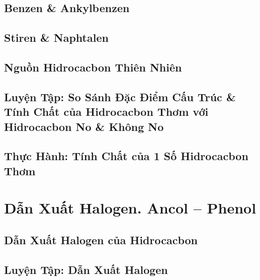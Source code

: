 \documentclass[oneside]{book}
\numberwithin{equation}{section}
\begin{document}
\section{Benzen \& Ankylbenzen}


\section{Stiren \& Naphtalen}


\section{Nguồn Hidrocacbon Thiên Nhiên}


\section{Luyện Tập: So Sánh Đặc Điểm Cấu Trúc \& Tính Chất của Hidrocacbon Thơm với Hidrocacbon No \& Không No}


\section{Thực Hành: Tính Chất của 1 Số Hidrocacbon Thơm}


\chapter{Dẫn Xuất Halogen. Ancol -- Phenol}

\section{Dẫn Xuất Halogen của Hidrocacbon}


\section{Luyện Tập: Dẫn Xuất Halogen}
\end{document}
